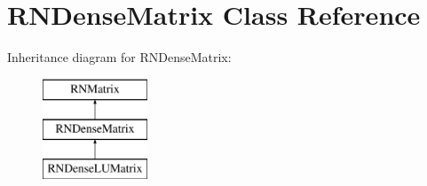 \hypertarget{class_r_n_dense_matrix}{}\section{R\+N\+Dense\+Matrix Class Reference}
\label{class_r_n_dense_matrix}
Inheritance diagram for R\+N\+Dense\+Matrix\+:\begin{figure}[H]
\begin{center}
\leavevmode
\includegraphics[height=3.000000cm]{class_r_n_dense_matrix}
\end{center}
\end{figure}
